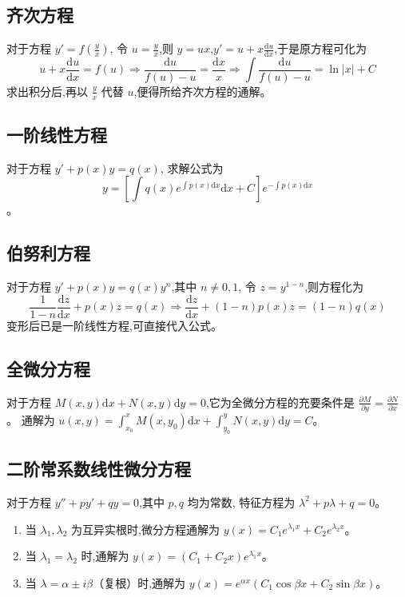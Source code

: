 \documentclass[UTF8]{ctexart}
\theoremstyle{remark}
\begin{document}
		\subsection{齐次方程}
		对于方程 \(y' = f\left(\frac{y}{x}\right)\),
		令 \(u = \frac{y}{x}\),则 \(y = ux\),\(y' = u + x\frac{\mathrm{d}u}{\mathrm{d}x}\),于是原方程可化为
		\[
		u + x\frac{\mathrm{d}u}{\mathrm{d}x}=f(u)\Rightarrow\frac{\mathrm{d}u}{f(u)-u}=\frac{\mathrm{d}x}{x}\Rightarrow\int\frac{\mathrm{d}u}{f(u)-u}=\ln|x| + C
		\]
		求出积分后,再以 \(\frac{y}{x}\) 代替 \(u\),便得所给齐次方程的通解。
		
		\subsection{一阶线性方程}
		对于方程 \(y' + p(x)y = q(x)\),
		求解公式为 \[y = \left[\int q(x)e^{\int p(x)\mathrm{d}x}\mathrm{d}x + C\right]e^{-\int p(x)\mathrm{d}x}\]。
		
		\subsection{伯努利方程}
		对于方程 \(y' + p(x)y = q(x)y^{n}\),其中 \(n\neq0,1\),
		令 \(z = y^{1 - n}\),则方程化为
		\[
		\frac{1}{1 - n}\frac{\mathrm{d}z}{\mathrm{d}x}+p(x)z = q(x)\Rightarrow\frac{\mathrm{d}z}{\mathrm{d}x}+(1 - n)p(x)z=(1 - n)q(x)
		\]
		变形后已是一阶线性方程,可直接代入公式。
		
		\subsection{全微分方程}
		对于方程 \(M(x, y)\mathrm{d}x + N(x, y)\mathrm{d}y = 0\),它为全微分方程的充要条件是 \(\frac{\partial M}{\partial y}=\frac{\partial N}{\partial x}\)。
		通解为 \(u(x, y)=\int_{x_0}^{x} M(x, y_0)\mathrm{d}x+\int_{y_0}^{y} N(x, y)\mathrm{d}y = C\)。
		
		\subsection{二阶常系数线性微分方程}
		对于方程 \(y'' + py' + qy = 0\),其中 \(p, q\) 均为常数,
		特征方程为 \(\lambda^{2}+p\lambda + q = 0\)。
		\begin{enumerate}
			\item 当 \(\lambda_1, \lambda_2\) 为互异实根时,微分方程通解为 \(y(x)=C_1e^{\lambda_1 x}+C_2e^{\lambda_2 x}\)。
			\item 当 \(\lambda_1 = \lambda_2\) 时,通解为 \(y(x)=(C_1 + C_2x)e^{\lambda_1 x}\)。
			\item 当 \(\lambda=\alpha\pm i\beta\)（复根）时,通解为 \(y(x)=e^{\alpha x}(C_1\cos\beta x + C_2\sin\beta x)\)。
		\end{enumerate}
		
\end{document}
